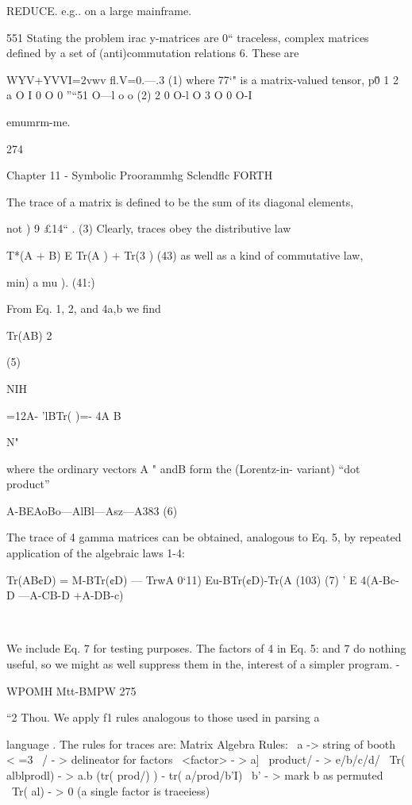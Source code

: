 REDUCE. e.g.. on a large mainframe.

551 Stating the problem
irac y-matrices are 0“ traceless, complex matrices deﬁned
by a set of (anti)commutation relations 6. These are

WYV+YVVI=2vwv ﬂ.V=0.---.3 (1)
where 77‘" is a matrix-valued tensor,
p\v0 1 2 a
O I 0 O 0
”“51 O—l o o (2)
2 0 O-l O
3 O 0 O-I


emumrm-me.

274

Chapter 11 - Symbolic Proorammhg Sclendﬂc FORTH

The trace of a matrix is deﬁned to be the sum of its diagonal
elements,

not ) 9 £14“ . (3)
Clearly, traces obey the distributive law

T*(A + B) E Tr(A ) + Tr(3 ) (43)
as well as a kind of commutative law,

min) a mu ). (41:)

From Eq. 1, 2, and 4a,b we ﬁnd

Tr(AB) 2%

(5)

NIH

 

=12A- 'lBTr( )=- 4A B

N"

where the ordinary vectors A " andB form the (Lorentz-in-
variant) “dot product”

A-BEAoBo—AlBl—Asz—A383 (6)

The trace of 4 gamma matrices can be obtained, analogous to
Eq. 5, by repeated application of the algebraic laws 1-4:

Tr(AB¢D) = M-BTr(¢D) — TrwA 0‘11)
Eu-BTr(¢D)-Tr(A (103) (7) '
E 4(A-Bc-D —A-CB-D +A-DB-c)

\

We include Eq. 7 for testing purposes. The factors of 4 in Eq. 5:
and 7 do nothing useful, so we might as well suppress them in the,
interest of a simpler program. -

 

WPOMH Mtt-BMPW 275

“2 Thou.
We apply f1 rules analogous to those used in parsing a

language . The rules for traces are:
\Gemma Matrix Algebra Rules:
\ a -> string of booth < =3
\ / - > delineator for factors
\ <factor> - > a]
\ product/ - > e/b/c/d/
\ Tr( alblprodl) - > a.b (tr( prod/) ) - tr( a/prod/b'I)
\ b' - > mark b as permuted
\ Tr( al) - > 0 (a single factor is traeeiess)


